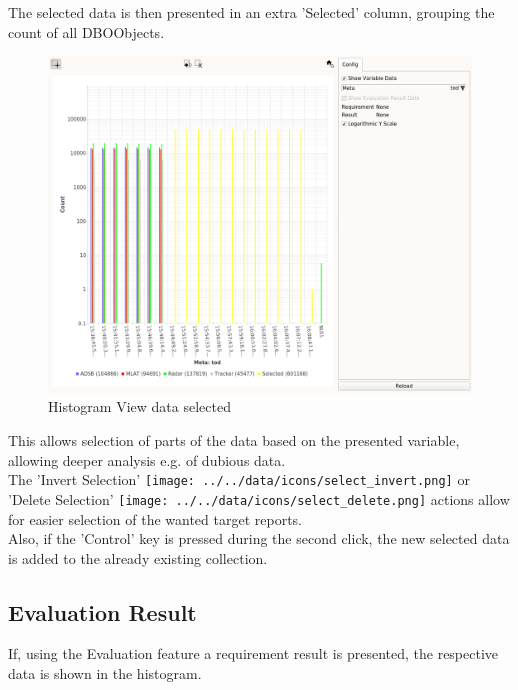 The selected data is then presented in an extra 'Selected' column, grouping the count of all DBOObjects.

\begin{figure}[H]
    \hspace*{-2cm}
    \includegraphics[width=18cm,frame]{../screenshots/histogram_selected.png}
  \caption{Histogram View data selected}
\end{figure}

This allows selection of parts of the data based on the presented variable, allowing deeper analysis e.g. of dubious data. \\

The 'Invert Selection' \texttt{[image: ../../data/icons/select\_invert.png]} or 'Delete Selection' \texttt{[image: ../../data/icons/select\_delete.png]} actions allow for easier selection of the wanted target reports. \\

Also, if the 'Control' key is pressed during the second click, the new selected data is added to the already existing collection.

\subsection{Evaluation Result}

If, using the Evaluation feature a requirement result is presented, the respective data is shown in the histogram.


